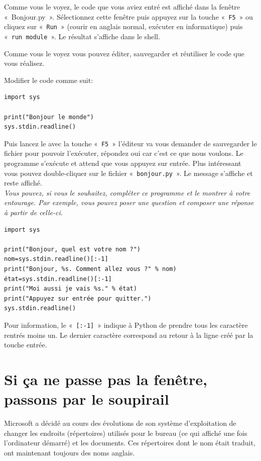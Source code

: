 Comme vous le voyez, le code que vous aviez entré est affiché dans la fenêtre « Bonjour.py ». Sélectionnez cette fenêtre puis appuyez sur la touche « \texttt{F5} » ou cliquez sur « \texttt{Run} » (courir en anglais normal, exécuter en informatique) puis « \texttt{run module} ». Le résultat s'affiche dans le shell.

Comme vous le voyez vous pouvez éditer, sauvegarder et réutiliser le code que vous réalisez.

Modifier le code comme suit: 

\begin{Verbatim}[frame=single,rulecolor=\color{mbleu}, label=à taper]
import sys

print("Bonjour le monde")
sys.stdin.readline()
\end{Verbatim}

Puis lancez le avec la touche « \texttt{F5} » l'éditeur va vous demander de sauvegarder le fichier pour pouvoir l'exécuter, répondez oui car c'est ce que nous voulons. Le programme s'exécute et attend que vous appuyez sur entrée. Plus intéressant vous pouvez double-cliquer sur le fichier « \texttt{bonjour.py} ». Le message s'affiche et reste affiché. \\

\emph{Vous pouvez, si vous le souhaitez, compléter ce programme et le montrer à votre entourage. Par exemple, vous pouvez poser une question et composer une réponse à partir de celle-ci.}\\

\begin{Verbatim}[frame=single,rulecolor=\color{mbleu}, label=à taper]
import sys

print("Bonjour, quel est votre nom ?")
nom=sys.stdin.readline()[:-1]
print("Bonjour, %s. Comment allez vous ?" % nom)
état=sys.stdin.readline()[:-1]
print("Moi aussi je vais %s." % état)
print("Appuyez sur entrée pour quitter.")
sys.stdin.readline()
\end{Verbatim}

Pour information, le « \texttt{[:-1]} »  indique à Python de prendre tous les caractère rentrés moins un. Le dernier caractère correspond au retour à la ligne créé par la touche entrée.


\section{Si ça ne passe pas la fenêtre, passons par le soupirail}
Microsoft a décidé au cours des évolutions de son système d'exploitation de changer les endroits (répertoires) utilisés pour le bureau (ce qui affiché une fois l'ordinateur démarré) et les documents. Ces répertoires dont le nom était traduit, ont maintenant toujours des noms anglais.

